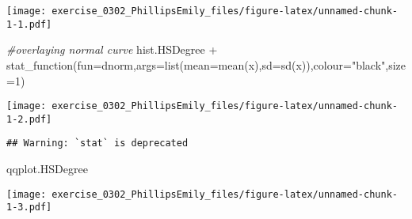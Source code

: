 \documentclass[
]{article}
\newenvironment{Shaded}{\begin{snugshade}}{\end{snugshade}}
\newcommand{\AttributeTok}[1]{\textcolor[rgb]{0.77,0.63,0.00}{#1}}
\newcommand{\CommentTok}[1]{\textcolor[rgb]{0.56,0.35,0.01}{\textit{#1}}}
\newcommand{\DecValTok}[1]{\textcolor[rgb]{0.00,0.00,0.81}{#1}}
\newcommand{\FunctionTok}[1]{\textcolor[rgb]{0.00,0.00,0.00}{#1}}
\newcommand{\NormalTok}[1]{#1}
\newcommand{\OtherTok}[1]{\textcolor[rgb]{0.56,0.35,0.01}{#1}}
\newcommand{\SpecialCharTok}[1]{\textcolor[rgb]{0.00,0.00,0.00}{#1}}
\newcommand{\StringTok}[1]{\textcolor[rgb]{0.31,0.60,0.02}{#1}}
\begin{document}
\texttt{[image: exercise\_0302\_PhillipsEmily\_files/figure-latex/unnamed-chunk-1-1.pdf]}

\begin{Shaded}
\begin{Highlighting}[]
\CommentTok{\#overlaying normal curve}
\NormalTok{hist.HSDegree }\SpecialCharTok{+} \FunctionTok{stat\_function}\NormalTok{(}\AttributeTok{fun=}\NormalTok{dnorm,}\AttributeTok{args=}\FunctionTok{list}\NormalTok{(}\AttributeTok{mean=}\FunctionTok{mean}\NormalTok{(x),}\AttributeTok{sd=}\FunctionTok{sd}\NormalTok{(x)),}\AttributeTok{colour=}\StringTok{"black"}\NormalTok{,}\AttributeTok{size=}\DecValTok{1}\NormalTok{)}
\end{Highlighting}
\end{Shaded}

\texttt{[image: exercise\_0302\_PhillipsEmily\_files/figure-latex/unnamed-chunk-1-2.pdf]}

\begin{Shaded}
\end{Shaded}

\begin{verbatim}
## Warning: `stat` is deprecated
\end{verbatim}

\begin{Shaded}
\begin{Highlighting}[]
\NormalTok{qqplot.HSDegree}
\end{Highlighting}
\end{Shaded}

\texttt{[image: exercise\_0302\_PhillipsEmily\_files/figure-latex/unnamed-chunk-1-3.pdf]}
\end{document}

